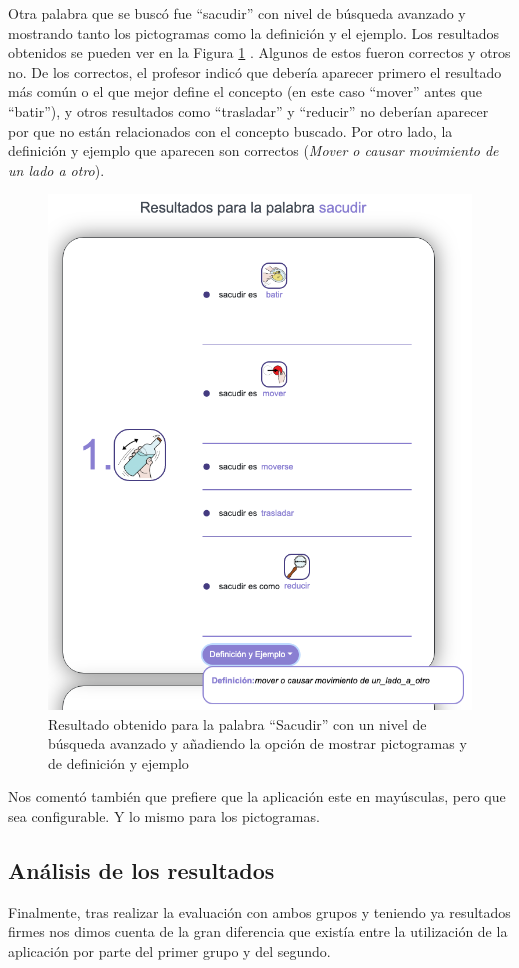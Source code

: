 Otra palabra que se buscó fue ``sacudir'' con nivel de búsqueda avanzado y mostrando tanto los pictogramas como la definición y el ejemplo. Los resultados obtenidos se pueden ver en la Figura \ref{fig:sacudirAvanzado} . Algunos de estos fueron correctos y otros no. De los correctos, el profesor indicó que debería aparecer primero el resultado más común o el que mejor define el concepto (en este caso ``mover'' antes que ``batir''), y otros resultados como ``trasladar'' y ``reducir'' no deberían aparecer por que no están relacionados con el concepto buscado.
Por otro lado, la definición y ejemplo que aparecen son correctos (\textit{Mover o causar movimiento de un lado a otro}). 
\begin{figure}[!h]
	\includegraphics[width=.7\textwidth]{Imagenes/Bitmap/Capitulo4/EvaluacionFinal/sacudiravanzado.png}
	\centering
	\caption{Resultado obtenido para la palabra ``Sacudir'' con un nivel de búsqueda avanzado y añadiendo la opción de mostrar pictogramas y de definición y ejemplo}
	\label{fig:sacudirAvanzado}
\end{figure}

Nos comentó también que prefiere que la aplicación este en mayúsculas, pero que sea configurable. Y lo mismo para los pictogramas.

\subsection{Análisis de los resultados}
\label{cap:subsec:analisisResultadosEvaluacion}
Finalmente, tras realizar la evaluación con ambos grupos y teniendo ya resultados firmes nos dimos cuenta de la gran diferencia que existía entre la utilización de la aplicación por parte del primer grupo y del segundo.


